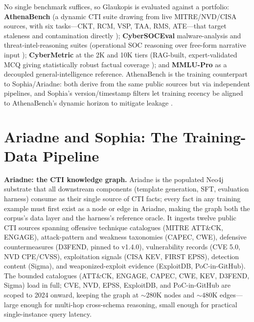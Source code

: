 \documentclass[conference]{IEEEtran}
\begin{document}
No single benchmark suffices, so Glaukopis is evaluated against a portfolio: \textbf{AthenaBench} (a dynamic CTI suite drawing from live MITRE/NVD/CISA sources, with six tasks---CKT, RCM, VSP, TAA, RMS, ATE---that target staleness and contamination directly \cite{alam2025athenabench}); \textbf{CyberSOCEval} malware-analysis and threat-intel-reasoning suites (operational SOC reasoning over free-form narrative input \cite{cybersoceval2025}); \textbf{CyberMetric} at the 2K and 10K tiers (RAG-built, expert-validated MCQ giving statistically robust factual coverage \cite{tihanyi2024cybermetric}); and \textbf{MMLU-Pro} as a decoupled general-intelligence reference. AthenaBench is the training counterpart to Sophia/Ariadne: both derive from the same public sources but via independent pipelines, and Sophia's version/timestamp filters let training recency be aligned to AthenaBench's dynamic horizon to mitigate leakage \cite{cardei2025ift,alam2025athenabench}.

\section{Ariadne and Sophia: The Training-Data Pipeline}
\label{sec:cti-kg}

\textbf{Ariadne: the CTI knowledge graph.} Ariadne is the populated Neo4j substrate that all downstream components (template generation, SFT, evaluation harness) consume as their single source of CTI facts; every fact in any training example must first exist as a node or edge in Ariadne, making the graph both the corpus's data layer and the harness's reference oracle. It ingests twelve public CTI sources spanning offensive technique catalogues (MITRE ATT\&CK, ENGAGE), attack-pattern and weakness taxonomies (CAPEC, CWE), defensive countermeasures (D3FEND, pinned to v1.4.0), vulnerability records (CVE 5.0, NVD CPE/CVSS), exploitation signals (CISA KEV, FIRST EPSS), detection content (Sigma), and weaponized-exploit evidence (ExploitDB, PoC-in-GitHub). The bounded catalogues (ATT\&CK, ENGAGE, CAPEC, CWE, KEV, D3FEND, Sigma) load in full; CVE, NVD, EPSS, ExploitDB, and PoC-in-GitHub are scoped to 2024 onward, keeping the graph at ${\sim}280$K nodes and ${\sim}480$K edges---large enough for multi-hop cross-schema reasoning, small enough for practical single-instance query latency.
\end{document}
